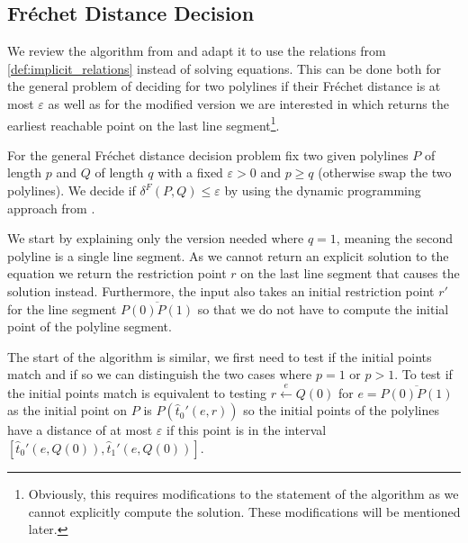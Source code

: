 \subsection{Fréchet Distance Decision}
We review the algorithm from \citeauthor{computing_the_frechet_distance_between_two_polygonal_curves} and adapt it to use the relations from \cref{def:implicit_relations} instead of solving equations. This can be done both for the general problem of deciding for two polylines if their Fréchet distance is at most \(\varepsilon\) as well as for the modified version we are interested in which returns the earliest reachable point on the last line segment\footnote{Obviously, this requires modifications to the statement of the algorithm as we cannot explicitly compute the solution. These modifications will be mentioned later.}. 

For the general Fréchet distance decision problem fix two given polylines \(P\) of length \(p\) and \(Q\) of length \(q\) with a fixed \(\varepsilon > 0\) and \(p \geq q\) (otherwise swap the two polylines). We decide if \(\delta^F(P, Q) \leq \varepsilon\) by using the dynamic programming approach from \citeauthor{computing_the_frechet_distance_between_two_polygonal_curves}. 

We start by explaining only the version needed where \(q = 1\), meaning the second polyline is a single line segment. As we cannot return an explicit solution to the equation we return the restriction point \(r\) on the last line segment that causes the solution instead. Furthermore, the input also takes an initial restriction point \(r'\) for the line segment \(\overline{P(0)P(1)}\) so that we do not have to compute the initial point of the polyline segment. 

The start of the algorithm is similar, we first need to test if the initial points match and if so we can distinguish the two cases where \(p = 1\) or \(p > 1\). To test if the initial points match is equivalent to testing \(r \overset e\leftarrow Q(0)\) for \(e = \overline{P(0)P(1)}\) as the initial point on \(P\) is \(P(\hat t_0'(e, r))\) so the initial points of the polylines have a distance of at most \(\varepsilon\) if this point is in the interval \([\hat t_0'(e, Q(0)), \hat t_1'(e, Q(0))]\).

